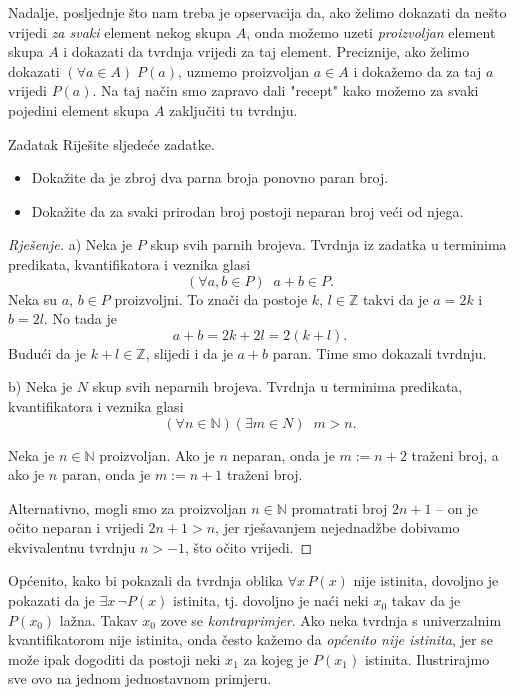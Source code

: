 Nadalje, posljednje što nam treba je opservacija da, ako želimo dokazati da nešto vrijedi \textit{za svaki} element nekog skupa \(A\), onda možemo uzeti \textit{proizvoljan} element skupa \(A\) i dokazati da tvrdnja vrijedi za taj element. Preciznije, ako želimo dokazati \((\forall{a\in A})\; P(a)\), uzmemo proizvoljan \(a\in A\) i dokažemo da za taj \(a\) vrijedi \(P(a)\). Na taj način smo zapravo dali "recept" kako možemo za svaki pojedini element skupa \(A\) zaključiti tu tvrdnju.
\begin{exercise}{Zadatak}
Riješite sljedeće zadatke. \begin{itemize}

\item[a)] Dokažite da je zbroj dva parna broja ponovno paran broj.
\item[b)] Dokažite da za svaki prirodan broj postoji neparan broj veći od njega.
\end{itemize}
\end{exercise}
\begin{proof}[Rješenje]
a) Neka je \(P\) skup svih parnih brojeva. Tvrdnja iz zadatka u terminima predikata, kvantifikatora i veznika glasi
\[(\forall a, b\in P)\;\; a+b\in P.\]
Neka su \(a\), \(b\in P\) proizvoljni. To znači da postoje \(k\), \(l\in \mathbb{Z}\) takvi da je \(a=2k\) i \(b=2l\). No tada je \[a+b=2k+2l=2(k+l).\] Budući da je \(k+l\in \mathbb{Z}\), slijedi i da je \(a+b\) paran. Time smo dokazali tvrdnju.

b) Neka je \(N\) skup svih neparnih brojeva. Tvrdnja u terminima predikata, kvantifikatora i veznika glasi
\[(\forall n\in \mathbb{N})(\exists m\in N)\;\; m>n.\]

Neka je $n\in \mathbb{N}$ proizvoljan. Ako je $n$ neparan, onda je $m:=n+2$ traženi broj, a ako je $n$ paran, onda je $m:=n+1$ traženi broj. 

Alternativno, mogli smo za proizvoljan $n\in \mathbb{N}$ promatrati broj $2n+1$ -- on je očito neparan i vrijedi $2n+1>n$, jer rješavanjem nejednadžbe dobivamo ekvivalentnu tvrdnju $n>-1$, što očito vrijedi.
\end{proof}
Općenito, kako bi pokazali da tvrdnja oblika \(\forall{x}\, P(x)\) nije istinita, dovoljno je pokazati da je \(\exists{x}\, \neg P(x)\) istinita, tj. dovoljno je naći neki \(x_0\) takav da je \(P(x_0)\) lažna. Takav \(x_0\) zove se \textit{kontraprimjer}. Ako neka tvrdnja s univerzalnim kvantifikatorom nije istinita, onda često kažemo da \textit{općenito nije istinita}, jer se može ipak dogoditi da postoji neki $x_1$ za kojeg je $P(x_1)$ istinita. Ilustrirajmo sve ovo na jednom jednostavnom primjeru.
